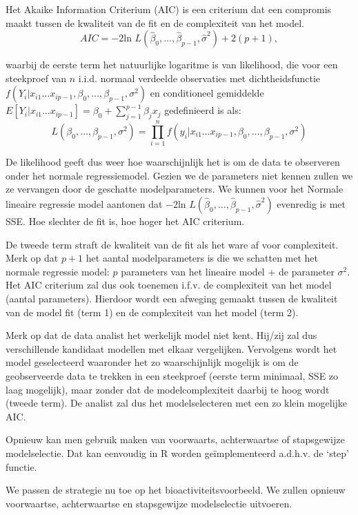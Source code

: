 \documentclass[
  dutch,
  letterpaper,
  12pt]{book}
\theoremstyle{definition}
\theoremstyle{definition}
\theoremstyle{definition}
\theoremstyle{remark}
\begin{document}
Het Akaike Information Criterium (AIC) is een criterium dat een
compromis maakt tussen de kwaliteit van de fit en de complexiteit van
het model.
\[AIC = -2 \text{ln } L(\hat \beta_0, \ldots, \hat \beta_{p-1}, \hat \sigma^2) + 2 (p+1),\]

waarbij de eerste term het natuurlijke logaritme is van likelihood, die
voor een steekproef van \(n\) i.i.d. normaal verdeelde observaties met
dichtheidsfunctie
\(f(Y_i \vert x_{i1} \ldots x_{ip-1}, \beta_0,\ldots, \beta_{p-1} ,\sigma^2)\)
en conditioneel gemiddelde
\(E[Y_i \vert x_{i1} \ldots x_{ip-1}]=\beta_0 + \sum_{j=1}^{p-1} \beta_j x_{j}\)
gedefinieerd is als: \[
L(\beta_0, \ldots, \beta_{p-1}, \sigma^2) = \prod\limits_{i=1}^n f(y_i \vert x_{i1} \ldots x_{ip-1}, \beta_0,\ldots, \beta_{p-1} ,\sigma^2)
\]

De likelihood geeft dus weer hoe waarschijnlijk het is om de data te
observeren onder het normale regressiemodel. Gezien we de parameters
niet kennen zullen we ze vervangen door de geschatte modelparameters. We
kunnen voor het Normale lineaire regressie model aantonen dat
\(-2 \text{ln } L(\hat \beta_0, \ldots, \hat \beta_{p-1}, \hat \sigma^2)\)
evenredig is met SSE. Hoe slechter de fit is, hoe hoger het AIC
criterium.

De tweede term straft de kwaliteit van de fit als het ware af voor
complexiteit. Merk op dat \(p+1\) het aantal modelparameters is die we
schatten met het normale regressie model: \(p\) parameters van het
lineaire model + de parameter \(\sigma^2\). Het AIC criterium zal dus
ook toenemen i.f.v. de complexiteit van het model (aantal parameters).
Hierdoor wordt een afweging gemaakt tussen de kwaliteit van de model fit
(term 1) en de complexiteit van het model (term 2).

Merk op dat de data analist het werkelijk model niet kent. Hij/zij zal
dus verschillende kandidaat modellen met elkaar vergelijken. Vervolgens
wordt het model geselecteerd waaronder het zo waarschijnlijk mogelijk is
om de geobserveerde data te trekken in een steekproef (eerste term
minimaal, SSE zo laag mogelijk), maar zonder dat de modelcomplexiteit
daarbij te hoog wordt (tweede term). De analist zal dus het
modelselecteren met een zo klein mogelijke AIC.

Opnieuw kan men gebruik maken van voorwaarts, achterwaartse of
stapsgewijze modelselectie. Dat kan eenvoudig in R worden
geïmplementeerd a.d.h.v. de `step' functie.

We passen de strategie nu toe op het bioactiviteitsvoorbeeld. We zullen
opnieuw voorwaartse, achterwaartse en stapsgewijze modelselectie
uitvoeren.
\end{document}
